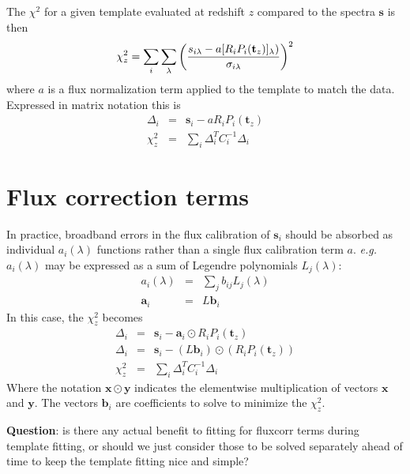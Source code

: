 \documentclass[12pt]{article}
\begin{document}
The $\chi^2$ for a given template evaluated at redshift $z$ compared to the
spectra $\mathbf{s}$ is then
\begin{equation}
    \chi^2_z = \sum_i \sum_\lambda
        \left( {s_{i\lambda} - a [R_i P_i(\mathbf{t}_{z})]_\lambda) \over
            \sigma_{i\lambda}} \right)^2
\end{equation}
where $a$ is a flux normalization term applied to the template to match the
data.
Expressed in matrix notation this is
\begin{eqnarray}
    \Delta_i & = & \mathbf{s}_i - a R_i P_i(\mathbf{t}_z) \\
    \chi^2_z & = & \sum_i \Delta_i^T C_i^{-1} \Delta_i
\end{eqnarray}

\section{Flux correction terms}

In practice, broadband errors in the flux calibration of $\mathbf{s}_i$
should be absorbed as individual $a_i(\lambda)$ functions rather than a
single flux calibration term $a$.  {\it e.g.}~$a_i(\lambda)$ may be expressed
as a sum of Legendre polynomials $L_j(\lambda)$:
\begin{eqnarray}
    a_i(\lambda) & = & \sum_j b_{ij} L_j(\lambda) \\
    \mathbf{a}_i & = & L \mathbf{b}_i
\end{eqnarray}
In this case, the $\chi^2_z$ becomes
\begin{eqnarray}
    \Delta_i & = & \mathbf{s}_i - \mathbf{a}_i \odot R_i P_i(\mathbf{t}_z) \\
    \Delta_i & = & \mathbf{s}_i - (L \mathbf{b}_i) \odot (R_i P_i(\mathbf{t}_z)) \\
    \chi^2_z & = & \sum_i \Delta_i^T C_i^{-1} \Delta_i
\end{eqnarray}
Where the notation $\mathbf{x} \odot \mathbf{y}$ indicates the elementwise
multiplication of vectors $\mathbf{x}$ and $\mathbf{y}$.  The vectors
$\mathbf{b}_i$ are coefficients to solve to minimize the $\chi^2_z$.

\textbf{Question}: is there any actual benefit to fitting for fluxcorr terms
during template fitting, or should we just consider those to be solved
separately ahead of time to keep the template fitting nice and simple?

\end{document}

